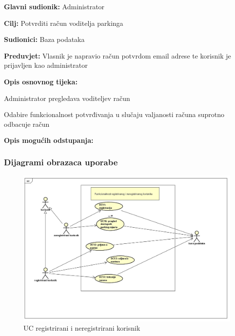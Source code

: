 \begin{packed_item}
\begin{packed_item}
    					\item \textbf{Glavni sudionik: } Administrator
    					\item  \textbf{Cilj:} Potvrditi račun voditelja parkinga
    					\item  \textbf{Sudionici:} Baza podataka
    					\item  \textbf{Preduvjet:} Vlasnik je napravio račun potvrdom email adrese te korisnik je prijavljen kao administrator
    					\item  \textbf{Opis osnovnog tijeka:}
    					
    					\item[] \begin{packed_enum}
    						
    						\item Administrator pregledava voditeljev račun
    						\item Odabire funkcionalnost potvrđivanja u slučaju valjanosti računa suprotno odbacuje račun

    					\end{packed_enum}
    					
    					\item  \textbf{Opis mogućih odstupanja:}
    					
    					
    				\end{packed_item}
    				
				
					
				\subsubsection{Dijagrami obrazaca uporabe}
					
					\begin{figure}[H]

						\includegraphics[width=\textwidth]{slika.jpeg} %
						\centering
						\caption{UC registrirani i neregistrirani korisnik}
						\label{fig:registrirani4312}
					\end{figure}
					

\end{packed_item}
